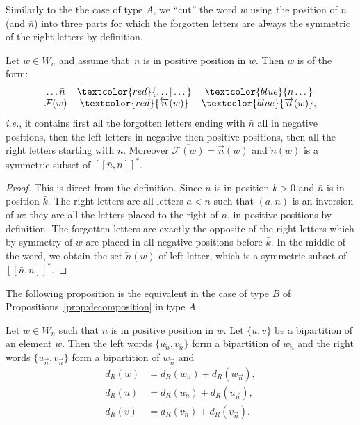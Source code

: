 \documentclass[ALCO,Unicode]{cedram}
\theoremstyle{definition}
\newcommand{\R}{{\overrightarrow{n}}}
\newcommand{\LL}{{\overleftarrow{n}}}
\newcommand{\dd}{d_R}
\newcommand{\Bsetnn}{[\![\bar{n},n ]\!]^*}
\newcommand{\F}{\mathcal{F}}
\newcommand{\red}[1]{\textcolor{red}{#1}}
\newcommand{\blue}[1]{\textcolor{blue}{#1}}
\begin{document}
Similarly to the the case of type $A$, we ``cut'' the word $w$ using the position of $n$ (and $\bar{n}$) into three parts for which the forgotten letters are always the symmetric of the right letters by definition.

\begin{lemm}
\label{lem:b-cut}
Let $w\in W_n$ and assume that~$n$ is in positive position in $w$. Then $w$ is of the form:
\begin{equation*}
\begin{array}{ccc}
\dots \bar{n}   & \red{\dots | \dots} & \blue{n \dots} \\
\F(w)           & \red{\LL(w)}         & \blue{\R(w)},
\end{array}
\end{equation*}
\emph{i.e.}, it contains first all the forgotten letters ending with $\bar{n}$ all in negative positions, then the left letters in negative then positive positions, then all the right letters starting with $n$. Moreover $\overline{\F(w)}=\R(w)$ and $\LL(w)$ is a symmetric subset of $\Bsetnn$.
\end{lemm}

\begin{proof}
This is direct from the definition. Since $n$ is in position $k > 0$ and $\bar{n}$ is in position $\bar k$. The right letters are all letters $a < n$ such that $(a,n)$ is an inversion of $w$: they are all the letters placed to the right of $n$, in positive positions by definition. The forgotten letters are exactly the opposite of the right letters which by symmetry of $w$ are placed in all negative positions before $\bar k$. In the middle of the word, we obtain the set $\LL(w)$ of left letter, which is a symmetric subset of $\Bsetnn$.
\end{proof}

The following proposition is the equivalent in the case of type $B$ of Propositions~\ref{prop:decomposition} in type $A$.

\begin{prop}
\label{prop:B-decomposition}
Let $w\in W_n$ such that $n$ is in positive position in $w$. Let $\lbrace u, v \rbrace$ be a bipartition of an element $w$. Then the left words $\lbrace u_\LL, v_\LL \rbrace$ form a bipartition of $w_\LL$ and the right words $\lbrace u_\R, v_\R \rbrace$ form a bipartition of $w_\R$ and
\begin{align}
\label{eq:B-deswdecomp}
\dd(w) &= \dd(w_\LL) + \dd(w_\R), \\
\label{eq:B-desudecomp}
\dd(u) &= \dd(u_\LL) + \dd(u_\R), \\
\label{eq:B-desvdecomp}
\dd(v) &= \dd(v_\LL) + \dd(v_\R).
\end{align}
\end{prop}
\end{document}
